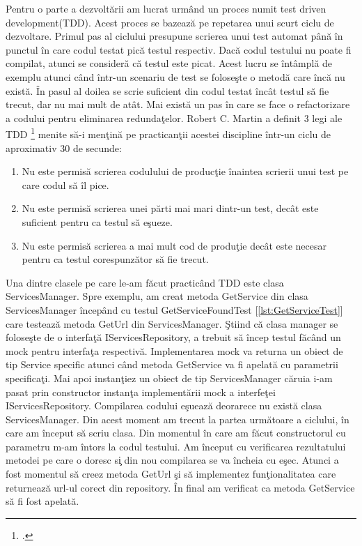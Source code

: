 \documentclass[a4paper,12pt]{report}
\let\oldref\ref
\renewcommand{\ref}[1]{[\oldref{#1}]}
\begin{document}
Pentru o parte a dezvolt\u arii am lucrat urm\^ and un proces numit test driven development(TDD).
Acest proces se bazeaz\u a pe repetarea unui scurt ciclu de dezvoltare. Primul pas al ciclului
presupune scrierea unui test automat p\^an\u a \^in punctul \^in care codul testat pic\u a testul respectiv.
Dac\u a codul testului nu poate fi compilat, atunci se consider\u a c\u a testul este picat. Acest lucru se \^int\^ampl\u a
de exemplu atunci c\^and \^intr-un scenariu de test se folose\c ste o metod\u a care \^inc\u a nu exist\u a.
\^In pasul al doilea se scrie suficient din codul testat \^inc\^at testul s\u a fie trecut, dar nu mai mult de at\^at.
Mai exist\u a un pas \^in care se face o refactorizare a codului pentru eliminarea redunda\c telor.
Robert C. Martin a definit 3 legi ale TDD \footcite{Martin:2011:CCC:1999258} menite s\u a-i men\c tin\u a pe practican\c tii 
acestei discipline \^intr-un ciclu de aproximativ 30 de secunde:
\begin{enumerate}
	\item Nu este permis\u a scrierea codulului de produc\c tie \^inaintea scrierii unui test pe care codul s\u a \^il 
	pice.
	\item Nu este permis\u a scrierea unei p\u arti mai mari dintr-un test, dec\^at este suficient pentru ca testul s\u a e\c sueze.
	\item Nu este permis\u a scrierea a mai mult cod de produ\c tie dec\^at este necesar pentru ca testul corespunz\u ator 
	s\u a fie trecut. 
\end{enumerate}

Una dintre clasele pe care le-am f\u acut practic\^and TDD este clasa ServicesManager.
Spre exemplu, am creat metoda GetService din clasa ServicesManager \^incep\^and cu testul GetServiceFoundTest \ref{lst:GetServiceTest}
care testeaz\u a metoda GetUrl din ServicesManager.
\c Stiind c\u a clasa manager se folose\c ste de o interfa\c t\u a IServicesRepository, a trebuit s\u a \^incep testul f\u ac\^and 
un mock pentru interfa\c ta respectiv\u a. Implementarea mock va returna un obiect de tip Service specific atunci c\^and 
metoda GetService va fi apelat\u a cu parametrii specifica\c ti. Mai apoi instan\c tiez un obiect de tip ServicesManager c\u aruia i-am pasat 
prin constructor instan\c ta implement\u arii mock a interfe\c tei IServicesRepository.
Compilarea codului e\c sueaz\u a deorarece nu exist\u a clasa ServicesManager.
Din acest moment am trecut la partea urm\u atoare a ciclului, \^in care am \^inceput s\u a scriu clasa.
Din momentul \^in care am f\u acut constructorul cu parametru m-am \^intors la codul testului.
Am \^inceput cu verificarea rezultatului metodei pe care o doresc s\c i din nou compilarea se va \^incheia cu e\c sec.
Atunci a fost momentul s\u a creez metoda GetUrl \c si s\u a implementez fun\c tionalitatea care returneaz\u a 
url-ul corect din repository.
\^In final am verificat ca metoda GetService s\u a fi fost apelat\u a.
\end{document}
